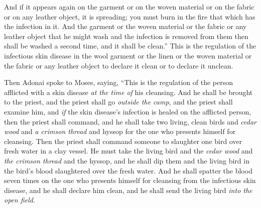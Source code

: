 \begin{biblechapter}
\verse And if it appears again on the garment or on the woven material or on the fabric or on any leather object, it is spreading; you must burn in the fire that which has the infection in it.
\verse And the garment or the woven material or the fabric or any leather object that he might wash and the infection is removed from them then shall be washed a second time, and it shall be clean.”
\verse This is the regulation of the infectious skin disease in the wool garment or the linen or the woven material or the fabric or any leather object to declare it clean or to declare it unclean.
\end{biblechapter}

\begin{biblechapter} %
 Then Adonai spoke to Moses, saying,
\verse “This is the regulation of the person afflicted with a skin disease \textit{at the time of} his cleansing. And he shall be brought to the priest,
\verse and the priest shall go \textit{outside the camp}, and the priest shall examine him, and \textit{if} the skin disease’s infection is healed on the afflicted person,
\verse then the priest shall command, and he shall take two living, clean birds and \textit{cedar wood} and \textit{a crimson thread} and hyssop for the one who presents himself for cleansing.
\verse Then the priest shall command someone to slaughter one bird over fresh water in a clay vessel.
\verse He must take the living bird and the \textit{cedar wood} and \textit{the crimson thread} and the hyssop, and he shall dip them and the living bird in the bird’s blood slaughtered over the fresh water.
\verse And he shall spatter the blood seven times on the one who presents himself for cleansing from the infectious skin disease, and he shall declare him clean, and he shall send the living bird \textit{into the open field}.

\end{biblechapter}
